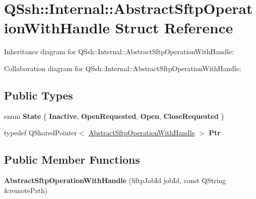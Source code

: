 \hypertarget{struct_q_ssh_1_1_internal_1_1_abstract_sftp_operation_with_handle}{}\section{Q\+Ssh\+:\+:Internal\+:\+:Abstract\+Sftp\+Operation\+With\+Handle Struct Reference}
\label{struct_q_ssh_1_1_internal_1_1_abstract_sftp_operation_with_handle}


Inheritance diagram for Q\+Ssh\+:\+:Internal\+:\+:Abstract\+Sftp\+Operation\+With\+Handle\+:


Collaboration diagram for Q\+Ssh\+:\+:Internal\+:\+:Abstract\+Sftp\+Operation\+With\+Handle\+:
\subsection*{Public Types}
\begin{DoxyCompactItemize}
\item 
\mbox{\label{struct_q_ssh_1_1_internal_1_1_abstract_sftp_operation_with_handle_a241125859699bbd9e015a249ebc2cb09}} 
enum {\bfseries State} \{ {\bfseries Inactive}, 
{\bfseries Open\+Requested}, 
{\bfseries Open}, 
{\bfseries Close\+Requested}
 \}
\item 
\mbox{\label{struct_q_ssh_1_1_internal_1_1_abstract_sftp_operation_with_handle_aa2fc3687dfedbb154d00cb692c92c7c0}} 
typedef Q\+Shared\+Pointer$<$ \mbox{\hyperlink{struct_q_ssh_1_1_internal_1_1_abstract_sftp_operation_with_handle}{Abstract\+Sftp\+Operation\+With\+Handle}} $>$ {\bfseries Ptr}
\end{DoxyCompactItemize}
\subsection*{Public Member Functions}
\begin{DoxyCompactItemize}
\item 
\mbox{\label{struct_q_ssh_1_1_internal_1_1_abstract_sftp_operation_with_handle_a25c304cda60411afff18b63336e92363}} 
{\bfseries Abstract\+Sftp\+Operation\+With\+Handle} (Sftp\+Job\+Id job\+Id, const Q\+String \&remote\+Path)
\end{DoxyCompactItemize}
